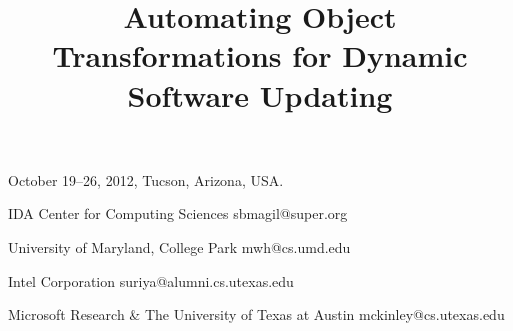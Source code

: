 \documentclass[natbib,10pt]{sigplanconf}
\begin{document}
 {October 19--26, 2012, Tucson, Arizona, USA.}

\title{Automating Object Transformations for Dynamic Software Updating
    }



            {IDA Center for Computing Sciences}
            {sbmagil@super.org}

            {University of Maryland, College Park}
            {mwh@cs.umd.edu}

            {Intel Corporation}
            {suriya@alumni.cs.utexas.edu}

            {Microsoft Research \& The University of Texas at Austin}
            {mckinley@cs.utexas.edu}

\maketitle
\end{document}
